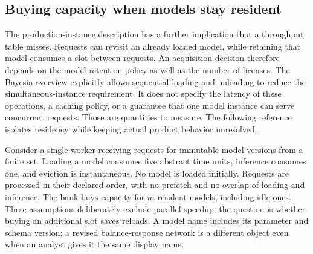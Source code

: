 \subsection{Buying capacity when models stay resident}
\label{exec17:s8-residency}

The production-instance description has a further implication that a throughput
table misses. Requests can revisit an already loaded model, while retaining
that model consumes a slot between requests. An acquisition decision therefore
depends on the model-retention policy as well as the number of licenses. The
Bayesia overview explicitly allows sequential loading and unloading to reduce
the simultaneous-instance requirement. It does not specify the latency of
these operations, a caching policy, or a guarantee that one model instance can
serve concurrent requests. Those are quantities to measure. The following
reference isolates residency while keeping actual product behavior unresolved
\citep{exec13_bayesia_api,exec17_s8_residency}.

Consider a single worker receiving requests for immutable model versions from
a finite set. Loading a model consumes five abstract time units, inference
consumes one, and eviction is instantaneous. No model is loaded initially.
Requests are processed in their declared order, with no prefetch and no overlap
of loading and inference. The bank buys capacity for $m$ resident models,
including idle ones. These assumptions deliberately exclude parallel speedup:
the question is whether buying an additional slot saves reloads. A model name
includes its parameter and schema version; a revised balance-response network
is a different object even when an analyst gives it the same display name.

